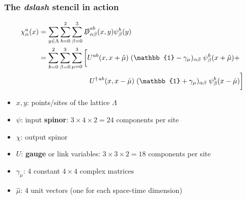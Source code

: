 \documentclass{beamer}
\begin{document}
%
%


  \begin{frame}
    \frametitle{The \textit{dslash} stencil in action}

    \begin{align*}
      \nonumber
      \chi^a_\alpha(x) &= \sum_{y \in \Lambda} \sum_{b = 0}^2 \sum_{\beta = 0}^3 \slashed D^{ab}_{\alpha \beta}(x,y) \psi^b_\beta(y) \\
      &= \sum_{b = 0}^2 \sum_{\beta = 0}^3 \sum_{\mu=0}^3
      \bigg[
        U^{ab}(x,x+\hat\mu) \; (\mathbb{1}-\gamma_\mu)_{\alpha\beta} \; \psi^b_\beta(x+\hat\mu) + \\
        \nonumber
        &\hspace{25.0mm}
        U^{\dagger\, ab}(x,x-\hat\mu) \; (\mathbb{1}+\gamma_\mu)_{\alpha\beta} \; \psi^b_\beta(x-\hat\mu)
      \bigg]
    \end{align*}

    \begin{itemize}
      \item $x,y$: points/sites of the lattice $\Lambda$\\
      \item $\psi$: input \textbf{spinor}: $3 \times 4 \times 2 = 24$ components per site\\
      \item $\chi$: output spinor\\
      \item $U$: \textbf{gauge} or link variables: $3 \times 3 \times 2 = 18$ components per site\\
      \item $\gamma_\mu$: 4 constant $4 \times 4$ complex matrices
      \item $\hat \mu$: 4 unit vectors (one for each space-time dimension)
    \end{itemize}

  \end{frame}
\end{document}
